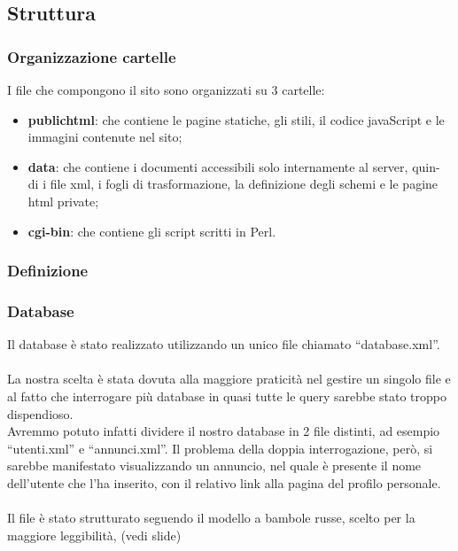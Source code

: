 \documentclass[12pt]{article}
\begin{document}
	\subsection{Struttura}
		\subsubsection{Organizzazione cartelle}
		
I file che compongono il sito sono organizzati su 3 cartelle:

\begin{itemize}

\item \textbf{public\textunderscore html}: che contiene le pagine statiche, gli stili, il codice javaScript e le immagini contenute nel sito;
\item \textbf{data}: che contiene i documenti accessibili solo internamente al server, quin- di i file xml, i fogli di trasformazione, la definizione degli schemi e le pagine 				   html private;
\item \textbf{cgi-bin}: che contiene gli script scritti in Perl.

\end{itemize}


	\subsubsection{Definizione}
	\subsubsection{Database}
	Il database è stato realizzato utilizzando un unico file chiamato “database.xml”.\\\\
	La nostra scelta è stata dovuta alla maggiore praticità nel gestire un singolo file e al fatto che interrogare più database in quasi tutte le query sarebbe stato 		troppo dispendioso.\\
	Avremmo potuto infatti dividere il nostro database in 2 file distinti, ad esempio “utenti.xml” e “annunci.xml”. Il problema della doppia interrogazione, però, si 		sarebbe manifestato visualizzando un annuncio, nel quale è presente il nome dell’utente che l’ha inserito, con il relativo link alla pagina del profilo personale.\\\\
	Il file è stato strutturato seguendo il modello a bambole russe, scelto per la maggiore leggibilità, (vedi slide)\\
	
\end{document}
